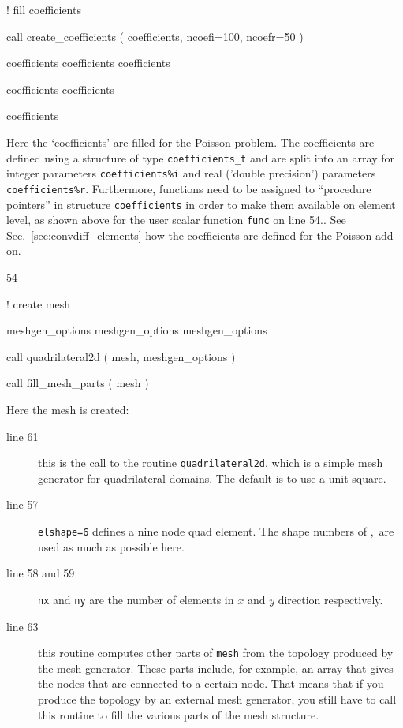 \begin{listingcont}
   
! fill coefficients

  call create_coefficients ( coefficients, ncoefi=100, ncoefr=50 )

  coefficients%
  coefficients%
  coefficients%

  coefficients%
  coefficients%

  coefficients%

\end{listingcont}

Here the `coefficients' are filled for the Poisson problem. The coefficients
are defined using a structure of type \texttt{coefficients\_t} and are split
into an array for integer parameters \texttt{coefficients\%i} and real ('double
precision') parameters \texttt{coefficients\%r}. Furthermore, functions need to be
assigned to ``procedure pointers'' in structure \texttt{coefficients} in order to
make them available on element level, as
shown above for the user scalar function \texttt{func} on line 54..
See Sec.~\ref{sec:convdiff_elements} how the coefficients are defined for the
Poisson add-on.

\begin{listing}{54}

! create mesh
                                                                                
  meshgen_options%
  meshgen_options%
  meshgen_options%

  call quadrilateral2d ( mesh, meshgen_options )

  call fill_mesh_parts ( mesh ) 

\end{listing}
Here the mesh is created:
\begin{description}
   \item[line 61] this is the call to the routine 
\texttt{quadrilateral2d}, which is a simple mesh generator for quadrilateral
domains. The default is to use a unit square.
   \item[line 57] \texttt{elshape=6} defines a nine node quad element.
 The shape numbers of \sep\ are used as much as possible here.
   \item[line 58 and 59] \texttt{nx} and \texttt{ny} are the number of elements
in $x$ and $y$ direction respectively.
   \item[line 63] this routine computes other parts of \texttt{mesh} from the
     topology produced by the mesh generator. These parts include, for example,
     an array that gives the nodes that are connected to a certain node. That
means that if you produce the topology by an external mesh generator, you
still have to call this routine to fill the various parts of the mesh
structure.
\end{description}

